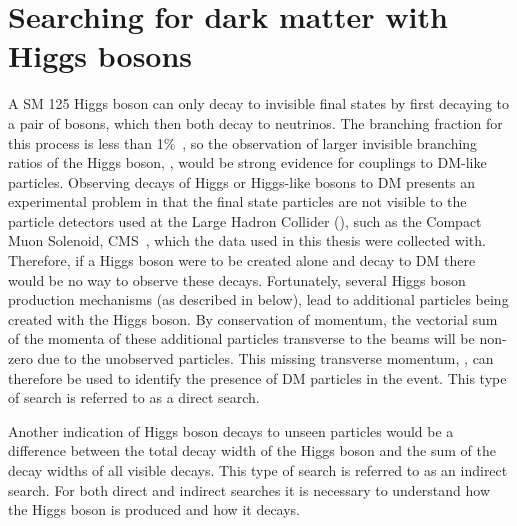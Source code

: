 \section{Searching for dark matter with Higgs bosons}
\label{sec:higgsdm}
A \ac{SM} 125 \GeV Higgs boson can only decay to invisible final states by first decaying to a pair of \PZ bosons, which then both decay to neutrinos. The branching fraction for this process is less than 1\%~\cite{Heinemeyer:1559921}, so the observation of larger invisible branching ratios of the Higgs boson, \BRinv, would be strong evidence for couplings to \ac{DM}-like particles. Observing decays of Higgs or Higgs-like bosons to \ac{DM} presents an experimental problem in that the final state particles are not visible to the particle detectors used at the Large Hadron Collider (\LHC), such as the Compact Muon Solenoid, CMS~\cite{Chatrchyan:2008aa}, which the data used in this thesis were collected with. Therefore, if a Higgs boson were to be created alone and decay to \ac{DM} there would be no way to observe these decays. Fortunately, several Higgs boson production mechanisms (as described in  below), lead to additional particles being created with the Higgs boson. By conservation of momentum, the vectorial sum of the momenta of these additional particles transverse to the \LHC beams will be non-zero due to the unobserved particles. This missing transverse momentum, \MET, can therefore be used to identify the presence of \ac{DM} particles in the event. This type of search is referred to as a direct search.

Another indication of Higgs boson decays to unseen particles would be a difference between the total decay width of the Higgs boson and the sum of the decay widths of all visible decays. This type of search is referred to as an indirect search. For both direct and indirect searches it is necessary to understand how the Higgs boson is produced and how it decays.

